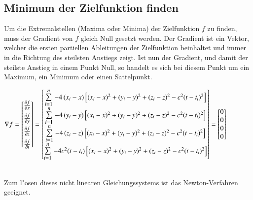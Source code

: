 	\subsection{Minimum der Zielfunktion finden}\label{Minimum der ZF}
		Um die Extremalstellen (Maxima oder Minima) der Zielfunktion $f$ zu finden, muss der Gradient von $f$ gleich Null gesetzt werden. Der Gradient ist ein Vektor, welcher die ersten partiellen Ableitungen der Zielfunktion beinhaltet und immer in die Richtung des steilsten Anstiegs zeigt. Ist nun der Gradient, und damit der steilste Anstieg in einem Punkt Null, so handelt es sich bei diesem Punkt um ein Maximum, ein Minimum oder einen Sattelpunkt.\\[0.2cm]
		\begin{minipage}{\textwidth}
		$ \nabla f = \begin{bmatrix} \frac{\partial f}{\partial x}\\[0.2cm] \frac{\partial f}{\partial y}\\[0.2cm] \frac{\partial f}{\partial z}\\[0.2cm] \frac{\partial f}{\partial t}\end{bmatrix} %
		= \begin{bmatrix} \text{\large$\sum\limits_{i=1}^{n}$}\;{-4\,(x_i-x)\left[(x_i - x)^2 + (y_i - y)^2 + (z_i - z)^2 - c^2(t - t_i)^2 \right]} \\\text{\large$\sum\limits_{i=1}^{n}$}\;{-4\,(y_i-y)\left[(x_i - x)^2 + (y_i - y)^2 + (z_i - z)^2 - c^2(t - t_i)^2 \right]} \\ \text{\large$\sum\limits_{i=1}^{n}$}\;{-4\,(z_i-z)\left[(x_i - x)^2 + (y_i - y)^2 + (z_i - z)^2 - c^2(t - t_i)^2 \right]} \\ \text{\large$\sum\limits_{i=1}^{n}$}\;{-4 c^2(t-t_i)\left[(x_i - x)^2 + (y_i - y)^2 + (z_i - z)^2 - c^2(t - t_i)^2\right]}\end{bmatrix} = \begin{bmatrix} 0 \\ 0 \\ 0 \\ 0 \end{bmatrix}$\\
		\end{minipage}\\[0.2cm]
		Zum l"osen dieses nicht linearen Gleichungssystems ist das Newton-Verfahren geeignet.

